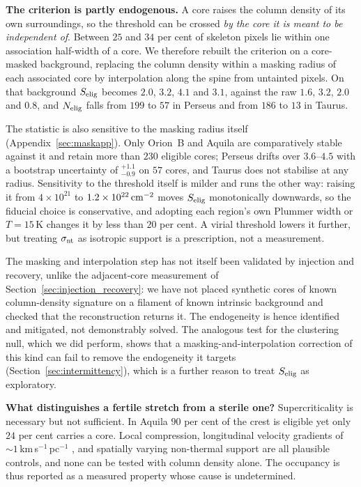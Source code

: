 \documentclass[usenatbib,twoside,twocolumn]{mnras}
\begin{document}
\smallskip\noindent\textbf{The criterion is partly endogenous.} A core raises the column density of its own surroundings, so the threshold can be crossed \emph{by the core it is meant to be independent of}. Between $25$ and $34$ per cent of skeleton pixels lie within one association half-width of a core. We therefore rebuilt the criterion on a core-masked background, replacing the column density within a masking radius of each associated core by interpolation along the spine from untainted pixels. On that background $S_{\rm elig}$ becomes $2.0$, $3.2$, $4.1$ and $3.1$, against the raw $1.6$, $3.2$, $2.0$ and $0.8$, and $N_{\rm elig}$ falls from $199$ to $57$ in Perseus and from $186$ to $13$ in Taurus.

The statistic is also sensitive to the masking radius itself (Appendix~\ref{sec:maskapp}). Only Orion~B and Aquila are comparatively stable against it and retain more than $230$ eligible cores; Perseus drifts over $3.6$--$4.5$ with a bootstrap uncertainty of $^{+1.1}_{-0.9}$ on $57$ cores, and Taurus does not stabilise at any radius. Sensitivity to the threshold itself is milder and runs the other way: raising it from $4\times10^{21}$ to $1.2\times10^{22}\,{\rm cm^{-2}}$ moves $S_{\rm elig}$ monotonically downwards, so the fiducial choice is conservative, and adopting each region's own Plummer width or $T=15$\,K changes it by less than $20$ per cent. A virial threshold lowers it further, but treating $\sigma_{\rm nt}$ as isotropic support is a prescription, not a measurement.

The masking and interpolation step has not itself been validated by injection and recovery, unlike the adjacent-core measurement of Section~\ref{sec:injection_recovery}: we have not placed synthetic cores of known column-density signature on a filament of known intrinsic background and checked that the reconstruction returns it. The endogeneity is hence identified and mitigated, not demonstrably solved. The analogous test for the clustering null, which we did perform, shows that a masking-and-interpolation correction of this kind can fail to remove the endogeneity it targets (Section~\ref{sec:intermittency}), which is a further reason to treat $S_{\rm elig}$ as exploratory.

\smallskip\noindent\textbf{What distinguishes a fertile stretch from a sterile one?} Supercriticality is necessary but not sufficient. In Aquila $90$ per cent of the crest is eligible yet only $24$ per cent carries a core. Local compression, longitudinal velocity gradients of $\sim1$\,km\,s$^{-1}$\,pc$^{-1}$ \citep{Kirk2013,Hacar2013}, and spatially varying non-thermal support are all plausible controls, and none can be tested with column density alone. The occupancy is thus reported as a measured property whose cause is undetermined.
\end{document}
